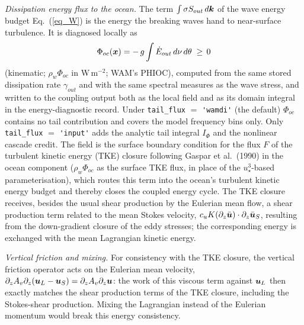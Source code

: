 \documentclass[12pt]{article}
\newcommand{\beq}  { \begin{eqnarray} }
\newcommand{\eeq}  { \end{eqnarray}}
\newcommand{\eq }  [1]{Eq.~(\ref{#1})}  %
\renewcommand{\v}[1]{{\mbox{\boldmath$ #1 $}}}  %
\newcommand{\p}{{\partial}}
\begin{document}
\emph{Dissipation energy flux to the ocean.} The term
$\int \sigma S_{out}\, d\v k$ of the wave energy budget \eq{eq_W} is
the energy the breaking waves hand to near-surface turbulence. It is diagnosed
locally as
\beq
\Phi_{oc}(\v x) = -\,g \int \dot E_{out}\, d\nu\, d\theta \;\ge\, 0
\eeq
(kinematic; $\rho_w \Phi_{oc}$ in W\,m$^{-2}$; WAM's PHIOC), computed from the
same stored dissipation rate $\gamma_{out}$ and with the same spectral
measures as the wave stress, and written to the coupling output both as the
local field and as its domain integral in the energy-diagnostic record.
Under \verb|tail_flux| $=$ \verb|'wamdi'| (the default) $\Phi_{oc}$ contains
no tail contribution and covers the model frequency bins only.
Only \verb|tail_flux| $=$ \verb|'input'| adds the analytic tail integral
$I_\Phi$ and the nonlinear cascade credit. The
field is the surface boundary condition for the flux $F$ of the turbulent
kinetic energy (TKE) closure following Gaspar et al.\ (1990) in the ocean
component ($\rho_w \Phi_{oc}$ as the surface TKE flux, in place of the
$u_\star^3$-based parameterisation), which routes this term into the ocean's
turbulent kinetic energy budget and thereby closes the coupled energy cycle.
The TKE closure receives, besides the usual shear production by the Eulerian
mean flow, a shear production term related to the mean Stokes velocity,
$c_u K (\p_z \bar{\v u}) \cdot \p_z \bar{\v u}_S$, resulting from the
down-gradient closure of the eddy stresses; the corresponding energy is
exchanged with the mean Lagrangian kinetic energy.

\emph{Vertical friction and mixing.} For consistency with the TKE closure,
the vertical friction operator acts on the Eulerian mean velocity,
$\p_z A_v \p_z (\v u_L - \v u_S) = \p_z A_v \p_z \v u$: the work of this
viscous term against $\v u_L$ then exactly matches the shear production
terms of the TKE closure, including the Stokes-shear production. Mixing the
Lagrangian instead of the Eulerian momentum would break this energy
consistency.
\end{document}
